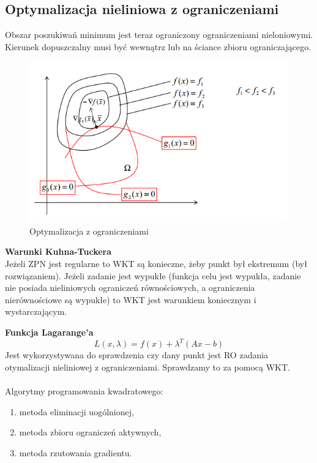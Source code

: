 \documentclass[12pt]{article}
\begin{document}
\subsection{Optymalizacja nieliniowa z ograniczeniami}
Obszar poszukiwań minimum jest teraz ograniczony ograniczeniami nieloniowymi. Kierunek dopuszczalny musi być wewnątrz lub na ściance zbioru ograniczającego.
\begin{figure}[H]
	\centering
	\includegraphics[scale=0.7]{Pictures/ograniczenia_nieliniowe}
	\caption{Optymalizacja z ograniczeniami}
\end{figure}

\textbf{Warunki Kuhna-Tuckera}\\
Jeżeli ZPN jest regularne to WKT są konieczne, żeby punkt był ekstremum (był rozwiązaniem). Jeżeli zadanie jest wypukłe (funkcja celu jest wypukła, zadanie nie posiada nieliniowych ograniczeń równościowych, a ograniczenia nierównościowe są wypukłe) to WKT jest warunkiem koniecznym i wystarczającym. 

\textbf{Funkcja Lagarange'a} $$L(x,\lambda) = f(x) + \lambda^{T}(Ax-b)$$ Jest wykorzystywana do sprawdzenia czy dany punkt jest RO zadania otymalizacji nieliniowej z ograniczeniami. Sprawdzamy to za pomocą WKT.\\
~\\
Algorytmy programowania kwadratowego:
\begin{enumerate}
	\item metoda eliminacji uogólnionej,
	\item metoda zbioru ograniczeń aktywnych,
	\item metoda rzutowania gradientu.
\end{enumerate}
\end{document}
